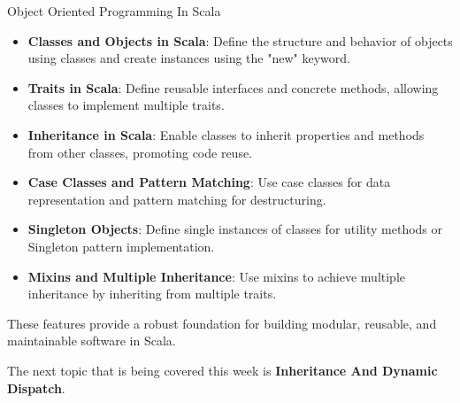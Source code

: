 \begin{notes}{Object Oriented Programming In Scala}
\begin{highlight}
        \begin{itemize}
            \item \textbf{Classes and Objects in Scala}: Define the structure and behavior of objects using classes and create instances using the "new" keyword.
            \item \textbf{Traits in Scala}: Define reusable interfaces and concrete methods, allowing classes to implement multiple traits.
            \item \textbf{Inheritance in Scala}: Enable classes to inherit properties and methods from other classes, promoting code reuse.
            \item \textbf{Case Classes and Pattern Matching}: Use case classes for data representation and pattern matching for destructuring.
            \item \textbf{Singleton Objects}: Define single instances of classes for utility methods or Singleton pattern implementation.
            \item \textbf{Mixins and Multiple Inheritance}: Use mixins to achieve multiple inheritance by inheriting from multiple traits.
        \end{itemize}
    
        These features provide a robust foundation for building modular, reusable, and maintainable software in Scala.
    
    \end{highlight}
\end{notes}

The next topic that is being covered this week is \textbf{Inheritance And Dynamic Dispatch}.

